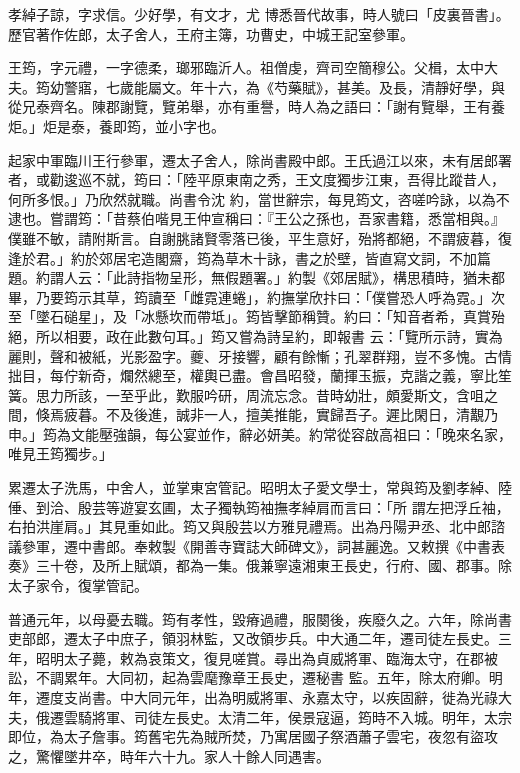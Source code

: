 \begin{pinyinscope}
 孝綽子諒，字求信。少好學，有文才，尤
 博悉晉代故事，時人號曰「皮裏晉書」。歷官著作佐郎，太子舍人，王府主簿，功曹史，中城王記室參軍。



 王筠，字元禮，一字德柔，瑯邪臨沂人。祖僧虔，齊司空簡穆公。父楫，太中大夫。筠幼警寤，七歲能屬文。年十六，為《芍藥賦》，甚美。及長，清靜好學，與從兄泰齊名。陳郡謝覽，覽弟舉，亦有重譽，時人為之語曰：「謝有覽舉，王有養炬。」炬是泰，養即筠，並小字也。



 起家中軍臨川王行參軍，遷太子舍人，除尚書殿中郎。王氏過江以來，未有居郎署者，或勸逡巡不就，筠曰：「陸平原東南之秀，王文度獨步江東，吾得比蹤昔人，何所多恨。」乃欣然就職。尚書令沈
 約，當世辭宗，每見筠文，咨嗟吟詠，以為不逮也。嘗謂筠：「昔蔡伯喈見王仲宣稱曰：『王公之孫也，吾家書籍，悉當相與。』僕雖不敏，請附斯言。自謝朓諸賢零落已後，平生意好，殆將都絕，不謂疲暮，復逢於君。」約於郊居宅造閣齋，筠為草木十詠，書之於壁，皆直寫文詞，不加篇題。約謂人云：「此詩指物呈形，無假題署。」約製《郊居賦》，構思積時，猶未都畢，乃要筠示其草，筠讀至「雌霓連蜷」，約撫掌欣抃曰：「僕嘗恐人呼為霓。」次至「墜石磓星」，及「冰懸坎而帶坻」。筠皆擊節稱贊。約曰：「知音者希，真賞殆絕，所以相要，政在此數句耳。」筠又嘗為詩呈約，即報書
 云：「覽所示詩，實為麗則，聲和被紙，光影盈字。夔、牙接響，顧有餘慚；孔翠群翔，豈不多愧。古情拙目，每佇新奇，爛然總至，權輿已盡。會昌昭發，蘭揮玉振，克諧之義，寧比笙簧。思力所該，一至乎此，歎服吟研，周流忘念。昔時幼壯，頗愛斯文，含咀之間，倏焉疲暮。不及後進，誠非一人，擅美推能，實歸吾子。遲比閑日，清覯乃申。」筠為文能壓強韻，每公宴並作，辭必妍美。約常從容啟高祖曰：「晚來名家，唯見王筠獨步。」



 累遷太子洗馬，中舍人，並掌東宮管記。昭明太子愛文學士，常與筠及劉孝綽、陸倕、到洽、殷芸等遊宴玄圃，太子獨執筠袖撫孝綽肩而言曰：「所
 謂左把浮丘袖，右拍洪崖肩。」其見重如此。筠又與殷芸以方雅見禮焉。出為丹陽尹丞、北中郎諮議參軍，遷中書郎。奉敕製《開善寺寶誌大師碑文》，詞甚麗逸。又敕撰《中書表奏》三十卷，及所上賦頌，都為一集。俄兼寧遠湘東王長史，行府、國、郡事。除太子家令，復掌管記。



 普通元年，以母憂去職。筠有孝性，毀瘠過禮，服闋後，疾廢久之。六年，除尚書吏部郎，遷太子中庶子，領羽林監，又改領步兵。中大通二年，遷司徒左長史。三年，昭明太子薨，敕為哀策文，復見嗟賞。尋出為貞威將軍、臨海太守，在郡被訟，不調累年。大同初，起為雲麾豫章王長史，遷秘書
 監。五年，除太府卿。明年，遷度支尚書。中大同元年，出為明威將軍、永嘉太守，以疾固辭，徙為光祿大夫，俄遷雲騎將軍、司徒左長史。太清二年，侯景寇逼，筠時不入城。明年，太宗即位，為太子詹事。筠舊宅先為賊所焚，乃寓居國子祭酒蕭子雲宅，夜忽有盜攻之，驚懼墜井卒，時年六十九。家人十餘人同遇害。




\end{pinyinscope}
